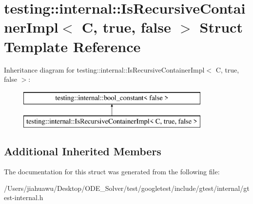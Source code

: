 \hypertarget{structtesting_1_1internal_1_1_is_recursive_container_impl_3_01_c_00_01true_00_01false_01_4}{}\section{testing\+:\+:internal\+:\+:Is\+Recursive\+Container\+Impl$<$ C, true, false $>$ Struct Template Reference}
\label{structtesting_1_1internal_1_1_is_recursive_container_impl_3_01_c_00_01true_00_01false_01_4}
Inheritance diagram for testing\+:\+:internal\+:\+:Is\+Recursive\+Container\+Impl$<$ C, true, false $>$\+:\begin{figure}[H]
\begin{center}
\leavevmode
\includegraphics[height=2.000000cm]{structtesting_1_1internal_1_1_is_recursive_container_impl_3_01_c_00_01true_00_01false_01_4}
\end{center}
\end{figure}
\subsection*{Additional Inherited Members}


The documentation for this struct was generated from the following file\+:\begin{DoxyCompactItemize}
\item 
/\+Users/jiahuawu/\+Desktop/\+O\+D\+E\+\_\+\+Solver/test/googletest/include/gtest/internal/gtest-\/internal.\+h\end{DoxyCompactItemize}
